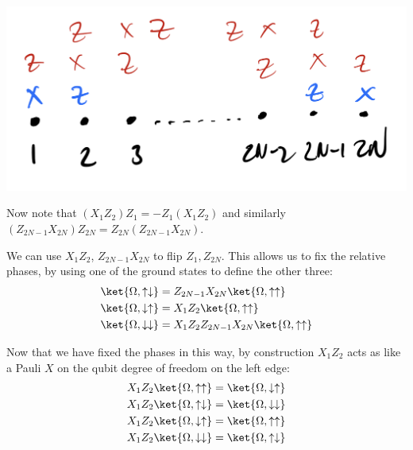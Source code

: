 \begin{center}
    \includegraphics[scale=0.4]{Lectures/Images/lec14-boundaryterms.png}
\end{center}

Now note that $(X_1Z_2)Z_1 = -Z_1(X_1Z_2)$ and similarly $(Z_{2N-1}X_{2N})Z_{2N} = Z_{2N}(Z_{2N-1}X_{2N})$.

We can use $X_1Z_2$, $Z_{2N-1}X_{2N}$ to flip $Z_1, Z_{2N}$. This allows us to fix the relative phases, by using one of the ground states to define the other three:
\begin{equation}
    \begin{split}
        \ket{\Omega, \uparrow\downarrow} &= Z_{2N-1}X_{2N}\ket{\Omega, \uparrow\uparrow}
        \\ \ket{\Omega, \downarrow\uparrow} &= X_1Z_2\ket{\Omega, \uparrow\uparrow}
        \\ \ket{\Omega, \downarrow\downarrow} &= X_1Z_2Z_{2N-1}X_{2N}\ket{\Omega, \uparrow\uparrow}
    \end{split}
\end{equation}

Now that we have fixed the phases in this way, by construction $X_1Z_2$ acts as like a Pauli $X$ on the qubit degree of freedom on the left edge:
\begin{equation}
    \begin{split}
        X_1Z_2\ket{\Omega, \uparrow\uparrow} &= \ket{\Omega, \downarrow\uparrow}
        \\ X_1Z_2\ket{\Omega, \uparrow\downarrow} &= \ket{\Omega, \downarrow\downarrow}
        \\ X_1Z_2\ket{\Omega, \downarrow\uparrow} &= \ket{\Omega, \uparrow\uparrow}
        \\ X_1Z_2\ket{\Omega, \downarrow\downarrow} &= \ket{\Omega, \uparrow\downarrow}
    \end{split}
\end{equation}

